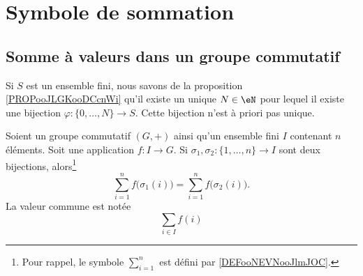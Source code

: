 \section{Symbole de sommation}

\subsection{Somme à valeurs dans un groupe commutatif}

Si \( S\) est un ensemble fini, nous savons de la proposition \ref{PROPooJLGKooDCcnWi} qu'il existe un unique \( N\in \eN\) pour lequel il existe une bijection \( \varphi\colon \{ 0,\ldots, N \}\to S\). Cette bijection n'est à priori pas unique.

\begin{lemmaDef}       \label{DEFooLNEXooYMQjRo}
	Soient un groupe commutatif \( (G,+)\) ainsi qu'un ensemble fini \( I\) contenant \( n\) éléments. Soit une application \( f\colon I\to G \). Si \( \sigma_1,\sigma_2\colon \{1,\ldots, n \}\to I\) sont deux bijections, alors\footnote{Pour rappel, le symbole \( \sum_{i=1}^n\) est défini par \ref{DEFooNEVNooJlmJOC}.}
	\begin{equation}
		\sum_{i=1}^nf\big( \sigma_1(i) \big)=\sum_{i=1}^nf\big( \sigma_2(i) \big).
	\end{equation}
	La valeur commune est notée
	\begin{equation}
		\sum_{i\in I}f(i)
	\end{equation}
\end{lemmaDef}

